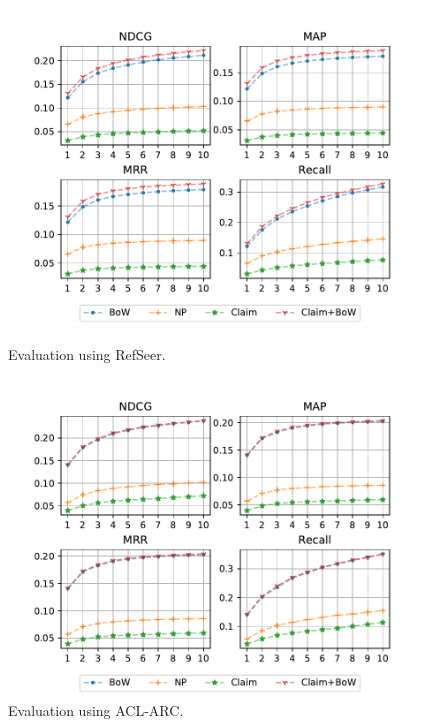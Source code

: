 \begin{figure}
  \centering
    \includegraphics[width=.9\textwidth]{figures/evaluation/RefSeer.pdf}
  \caption{Evaluation using RefSeer.}
  \label{fig:evalrefseer}

  \centering
    \includegraphics[width=.9\textwidth]{figures/evaluation/ACL.pdf}
  \caption{Evaluation using ACL-ARC.}
  \label{fig:evalacl}
\end{figure}


